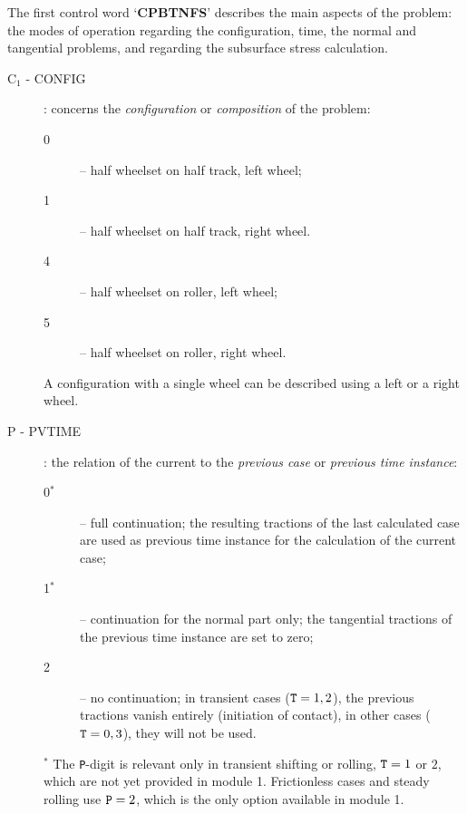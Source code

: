 \documentclass[12pt]{report}
\begin{document}
The first control word `{\bf CPBTNFS}' describes the main aspects of the
problem: the modes of operation regarding the configuration, time, the
normal and tangential problems, and regarding the subsurface stress
calculation.
\begin{description}
\item[C$_1$ - CONFIG] \label{c1-digit} : concerns the {\em 
        configuration\/} or {\em composition\/} of the problem:
\begin{description}
\item[0] -- half wheelset on half track, left wheel;
\item[1] -- half wheelset on half track, right wheel.
\item[4] -- half wheelset on roller, left wheel;
\item[5] -- half wheelset on roller, right wheel.
\end{description}
A configuration with a single wheel can be described using a left or a right
wheel.

\item[P - PVTIME]\label{p-digit} : the relation of the current to the
        {\em previous case\/} or {\em previous time instance\/}:
\begin{description}
\item[0$^*$] -- full continuation; the resulting tractions of the last
                calculated case are used as previous time instance for the
                calculation of the current case;
\item[1$^*$] -- continuation for the normal part only; the tangential
                tractions of the previous time instance are set to zero;
\item[2] -- no continuation; in transient cases (${\tt T}=1, 2$), the
        previous tractions vanish entirely (initiation of contact), in
        other cases (${\tt T}=0, 3$), they will not be used.
\end{description}
$^*$ The {\tt P}-digit is relevant only in transient shifting or rolling,
${\tt T}=1$ or $2$, which are not yet provided in module 1.
Frictionless cases and steady rolling use ${\tt P}=2$, which is the only
option available in module 1.


\end{description}
\end{document}
